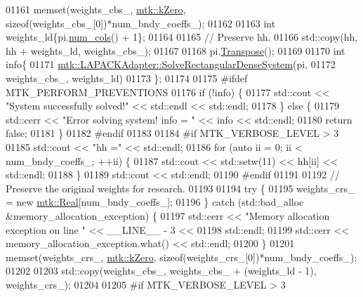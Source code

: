 \begin{DoxyCode}
{{01161   memset(weights\_cbs\_, \hyperlink{group__c01-roots_ga59a451a5fae30d59649bcda274fea271}{mtk::kZero}, \textcolor{keyword}{sizeof}(weights\_cbs\_[0])*num\_bndy\_coeffs\_);
01162 
01163   \textcolor{keywordtype}{int} weights\_ld\{pi.\hyperlink{classmtk_1_1DenseMatrix_a41747502d468c6728a4be31501b16e0e}{num\_cols}() + 1\};
01164 
01165   \textcolor{comment}{// Preserve hh.}
01166   std::copy(hh, hh + weights\_ld, weights\_cbs\_);
01167 
01168   pi.\hyperlink{classmtk_1_1DenseMatrix_a71d9c07ca66e88d97d1fd5012f43138b}{Transpose}();
01169 
01170   \textcolor{keywordtype}{int} info\{
01171     \hyperlink{classmtk_1_1LAPACKAdapter_a380f148ffdf96bae2f79ae28f1a6560c}{mtk::LAPACKAdapter::SolveRectangularDenseSystem}(pi,
01172                                                     weights\_cbs\_, weights\_ld)
01173   \};
01174 
01175 \textcolor{preprocessor}{  #ifdef MTK\_PERFORM\_PREVENTIONS}
01176   \textcolor{keywordflow}{if} (!info) \{
01177     std::cout << \textcolor{stringliteral}{"System successfully solved!"} << std::endl << std::endl;
01178   \} \textcolor{keywordflow}{else} \{
01179     std::cerr << \textcolor{stringliteral}{"Error solving system! info = "} << info << std::endl;
01180     \textcolor{keywordflow}{return} \textcolor{keyword}{false};
01181   \}
01182 \textcolor{preprocessor}{  #endif}
01183 
01184 \textcolor{preprocessor}{  #if MTK\_VERBOSE\_LEVEL > 3}
01185   std::cout << \textcolor{stringliteral}{"hh ="} << std::endl;
01186   \textcolor{keywordflow}{for} (\textcolor{keyword}{auto} ii = 0; ii < num\_bndy\_coeffs\_; ++ii) \{
01187     std::cout << std::setw(11) << hh[ii] << std::endl;
01188   \}
01189   std::cout << std::endl;
01190 \textcolor{preprocessor}{  #endif}
01191 
01192   \textcolor{comment}{// Preserve the original weights for research.}
01193 
01194   \textcolor{keywordflow}{try} \{
01195     weights\_crs\_ = \textcolor{keyword}{new} \hyperlink{group__c01-roots_gac080bbbf5cbb5502c9f00405f894857d}{mtk::Real}[num\_bndy\_coeffs\_];
01196   \} \textcolor{keywordflow}{catch} (std::bad\_alloc &memory\_allocation\_exception) \{
01197     std::cerr << \textcolor{stringliteral}{"Memory allocation exception on line "} << \_\_LINE\_\_ - 3 <<
01198       std::endl;
01199     std::cerr << memory\_allocation\_exception.what() << std::endl;
01200   \}
01201   memset(weights\_crs\_, \hyperlink{group__c01-roots_ga59a451a5fae30d59649bcda274fea271}{mtk::kZero}, \textcolor{keyword}{sizeof}(weights\_crs\_[0])*num\_bndy\_coeffs\_);
01202 
01203   std::copy(weights\_cbs\_, weights\_cbs\_ + (weights\_ld - 1), weights\_crs\_);
01204 
01205 \textcolor{preprocessor}{  #if MTK\_VERBOSE\_LEVEL > 3}
}}
\end{DoxyCode}
